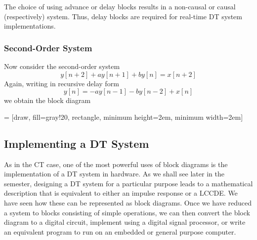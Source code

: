 The choice of using advance or delay blocks results in a non-causal or causal (respectively) system. Thus, delay blocks are required for real-time DT system implementations.

\subsubsection*{Second-Order System}

Now consider the second-order system
\[
y[n+2] + ay[n+1] + by[n] = x[n+2]
\]
Again, writing in recursive delay form 
\[
y[n] = -ay[n-1] - by[n-2] + x[n]
\]
we obtain the block diagram
\begin{center}
   = [draw, fill=gray!20, rectangle, 
      minimum height=2em, minimum width=2em]
\end{center}

\subsection{Implementing a DT System}

As in the CT case, one of the most powerful uses of block diagrams is the implementation of a DT system in hardware. As we shall see later in the semester, designing a DT system for a particular purpose leads to a mathematical description that is equivalent to either an impulse response or a LCCDE. We have seen how these can be represented as block diagrams. Once we have reduced a system to blocks consisting of simple operations, we can then convert the block diagram to a digital circuit, implement using a digital signal processor, or write an equivalent program to run on an embedded or general purpose computer.

